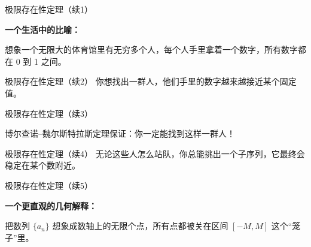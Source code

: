 \documentclass[aspectratio=169,10pt,fontset=fandol]{ctexbeamer}
\begin{document}
\begin{frame}[t,fragile]{极限存在性定理（续1）}
\footnotesize
{\footnotesize


\textbf{一个生活中的比喻：}

想象一个无限大的体育馆里有无穷多个人，每个人手里拿着一个数字，所有数字都在 0 到 1 之间。
}
\end{frame}
\begin{frame}[t,fragile]{极限存在性定理（续2）}
\footnotesize
{\footnotesize
你想找出一群人，他们手里的数字越来越接近某个固定值。
}
\end{frame}
\begin{frame}[t,fragile]{极限存在性定理（续3）}
\footnotesize
{\footnotesize


博尔查诺--魏尔斯特拉斯定理保证：你一定能找到这样一群人！
}
\end{frame}
\begin{frame}[t,fragile]{极限存在性定理（续4）}
\footnotesize
{\footnotesize
无论这些人怎么站队，你总能挑出一个子序列，它最终会稳定在某个数附近。
}
\end{frame}
\begin{frame}[t,fragile]{极限存在性定理（续5）}
\footnotesize
{\footnotesize


\textbf{一个更直观的几何解释：}

把数列 \(\{a_n\}\) 想象成数轴上的无限个点，所有点都被关在区间 \([-M, M]\) 这个“笼子”里。
}
\end{frame}
\end{document}
